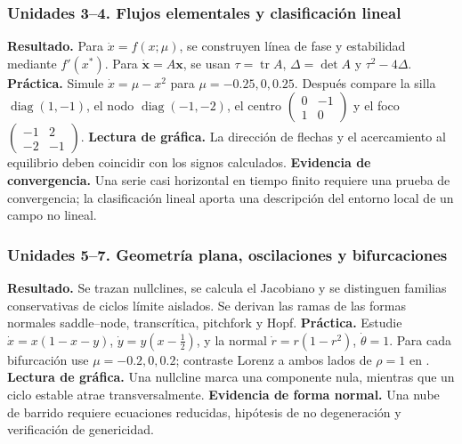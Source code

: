 \subsubsection*{Unidades 3--4. Flujos elementales y clasificación lineal}
\textbf{Resultado.} Para \(\dot x=f(x;\mu)\), se construyen línea de fase y
estabilidad mediante \(f'(x^*)\). Para \(\dot{\mathbf{x}}=A\mathbf{x}\), se usan
\(\tau=\operatorname{tr}A\), \(\Delta=\det A\) y
\(\tau^2-4\Delta\). \textbf{Práctica.} Simule \(\dot x=\mu-x^2\) para
\(\mu=-0.25,0,0.25\). Después compare la silla
\(\operatorname{diag}(1,-1)\), el nodo \(\operatorname{diag}(-1,-2)\), el centro
\(\left(\begin{smallmatrix}0&-1\\1&0\end{smallmatrix}\right)\) y el foco
\(\left(\begin{smallmatrix}-1&2\\-2&-1\end{smallmatrix}\right)\).
\textbf{Lectura de gráfica.} La dirección de flechas y el acercamiento al equilibrio
deben coincidir con los signos calculados. \textbf{Evidencia de convergencia.} Una serie casi
horizontal en tiempo finito requiere una prueba de convergencia; la clasificación lineal
aporta una descripción del entorno local de un campo no lineal.

\subsubsection*{Unidades 5--7. Geometría plana, oscilaciones y bifurcaciones}
\textbf{Resultado.} Se trazan nullclines, se calcula el Jacobiano y se distinguen
familias conservativas de ciclos límite aislados. Se derivan las ramas de las formas
normales saddle--node, transcrítica, pitchfork y Hopf.
\textbf{Práctica.} Estudie
\(\dot x=x(1-x-y)\), \(\dot y=y(x-\tfrac12)\), y la normal
\(\dot r=r(1-r^2)\), \(\dot\theta=1\). Para cada bifurcación use
\(\mu=-0.2,0,0.2\); contraste Lorenz a ambos lados de \(\rho=1\) en
. \textbf{Lectura de gráfica.} Una nullcline marca una componente nula,
mientras que un ciclo estable atrae transversalmente.
\textbf{Evidencia de forma normal.} Una nube de barrido requiere ecuaciones reducidas,
hipótesis de no degeneración y verificación de genericidad.

